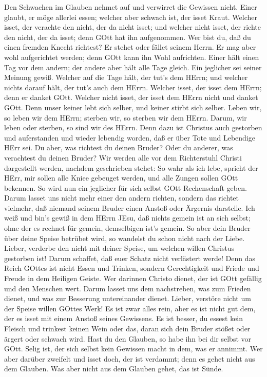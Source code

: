  Den Schwachen im Glauben nehmet auf und verwirret die
Gewissen nicht.  Einer glaubt, er möge allerlei essen;
welcher aber schwach ist, der isset Kraut.  Welcher isset,
der verachte den nicht, der da nicht isset; und welcher nicht isset, der
richte den nicht, der da isset; denn GOtt hat ihn aufgenommen.
 Wer bist du, daß du einen fremden Knecht richtest? Er
stehet oder fället seinem Herrn. Er mag aber wohl aufgerichtet werden;
denn GOtt kann ihn Wohl aufrichten.  Einer hält einen Tag
vor dem andern; der andere aber hält alle Tage gleich. Ein jeglicher sei
seiner Meinung gewiß.  Welcher auf die Tage hält, der tut's
dem HErrn; und welcher nichts darauf hält, der tut's auch dem HErrn.
Welcher isset, der isset dem HErrn; denn er danket GOtt. Welcher nicht
isset, der isset dem HErrn nicht und danket GOtt.  Denn
unser keiner lebt sich selber, und keiner stirbt sich selber.
 Leben wir, so leben wir dem HErrn; sterben wir, so sterben
wir dem HErrn. Darum, wir leben oder sterben, so sind wir des HErrn.
 Denn dazu ist Christus auch gestorben und auferstanden und
wieder lebendig worden, daß er über Tote und Lebendige HErr sei.
 Du aber, was richtest du deinen Bruder? Oder du anderer,
was verachtest du deinen Bruder? Wir werden alle vor dem Richterstuhl
Christi dargestellt werden,  nachdem geschrieben stehet: So
wahr als ich lebe, spricht der HErr, mir sollen alle Kniee gebeuget
werden, und alle Zungen sollen GOtt bekennen.  So wird nun
ein jeglicher für sich selbst GOtt Rechenschaft geben. 
Darum lasset uns nicht mehr einer den andern richten, sondern das
richtet vielmehr, daß niemand seinem Bruder einen Anstoß oder Ärgernis
darstelle.  Ich weiß und bin's gewiß in dem HErrn JEsu, daß
nichts gemein ist an sich selbst; ohne der es rechnet für gemein,
demselbigen ist's gemein.  So aber dein Bruder über deine
Speise betrübet wird, so wandelst du schon nicht nach der Liebe. Lieber,
verderbe den nicht mit deiner Speise, um welchen willen Christus
gestorben ist!  Darum schaffet, daß euer Schatz nicht
verlästert werde!  Denn das Reich GOttes ist nicht Essen
und Trinken, sondern Gerechtigkeit und Friede und Freude in dem Heiligen
Geiste.  Wer darinnen Christo dienet, der ist GOtt gefällig
und den Menschen wert.  Darum lasset uns dem nachstreben,
was zum Frieden dienet, und was zur Besserung untereinander dienet.
 Lieber, verstöre nicht um der Speise willen GOttes Werk!
Es ist zwar alles rein, aber es ist nicht gut dem, der es isset mit
einem Anstoß seines Gewissens.  Es ist besser, du essest
kein Fleisch und trinkest keinen Wein oder das, daran sich dein Bruder
stößet oder ärgert oder schwach wird.  Hast du den Glauben,
so habe ihn bei dir selbst vor GOtt. Selig ist, der sich selbst kein
Gewissen macht in dem, was er annimmt.  Wer aber darüber
zweifelt und isset doch, der ist verdammt; denn es gehet nicht aus dem
Glauben. Was aber nicht aus dem Glauben gehet, das ist Sünde.

